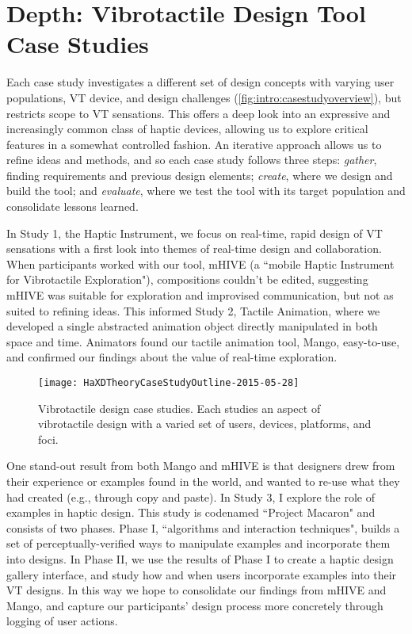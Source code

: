 \section{Depth: Vibrotactile Design Tool Case Studies}

Each case study investigates a different set of design concepts with varying user populations, VT device, and design challenges (\autoref{fig:intro:casestudyoverview}), but restricts scope to VT sensations.
This offers a deep look into an expressive and increasingly common class of haptic devices, allowing us to explore critical features in a somewhat controlled fashion.
An iterative approach allows us to refine ideas and methods, and so each case study follows three steps: \emph{gather}, finding requirements and previous design elements; \emph{create}, where we design and build the tool; and \emph{evaluate}, where we test the tool with its target population and consolidate lessons learned.

In Study 1, the Haptic Instrument, we focus on real-time, rapid design of VT sensations with a first look into themes of real-time design and collaboration.
When participants worked with our tool, mHIVE (a ``mobile Haptic Instrument for Vibrotactile Exploration"), compositions couldn't be edited, suggesting mHIVE was suitable for exploration and improvised communication, but not as suited to refining ideas.
This informed Study 2, Tactile Animation, where we developed a single abstracted animation object directly manipulated in both space and time.
Animators found our tactile animation tool, Mango, easy-to-use, and confirmed our findings about the value of real-time exploration.


\begin{figure}[htbp]
\begin{center}
\texttt{[image: HaXDTheoryCaseStudyOutline-2015-05-28]}
\caption{Vibrotactile design case studies. Each studies an aspect of vibrotactile design with a varied set of users, devices, platforms, and foci.}
\label{fig:intro:casestudyoverview}
\end{center}
\end{figure}

One stand-out result from both Mango and mHIVE is that designers drew from their experience or examples found in the world, and wanted to re-use what they had created (e.g., through copy and paste).
In Study 3, I explore the role of examples in haptic design.
This study is codenamed ``Project Macaron" and consists of two phases.
Phase I, ``algorithms and interaction techniques", builds a set of perceptually-verified ways to manipulate examples and incorporate them into designs.
In Phase II, we use the results of Phase I to create a haptic design gallery interface, and study how and when users incorporate examples into their VT designs.
In this way we hope to consolidate our findings from mHIVE and Mango, and capture our participants' design process more concretely through logging of user actions.

